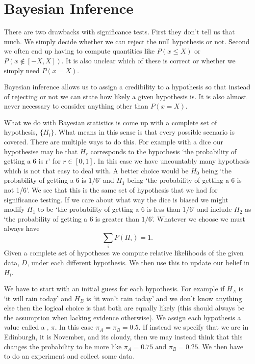 \documentclass[a4paper]{article}
\begin{document}
    \section{Bayesian Inference}
    There are two drawbacks with significance tests.
    First they don't tell us that much.
    We simply decide whether we can reject the null hypothesis or not.
    Second we often end up having to compute quantities like \(P(x \le X)\) or \(P(x \notin [-X, X])\).
    It is also unclear which of these is correct or whether we simply need \(P(x = X)\).
    
    Bayesian inference allows us to assign a credibility to a hypothesis so that instead of rejecting or not we can state how likely a given hypothesis is.
    It is also almost never necessary to consider anything other than \(P(x = X)\).
    
    What we do with Bayesian statistics is come up with a complete set of hypothesis, \(\{H_i\}\).
    What  means in this sense is that every possible scenario is covered.
    There are multiple ways to do this.
    For example with a dice our hypothesise may be that \(H_r\) corresponds to the hypothesis `the probability of getting a 6 is r' for \(r \in [0, 1]\).
    In this case we have uncountably many hypothesis which is not that easy to deal with.
    A better choice would be \(H_0\) being `the probability of getting a 6 is \(1/6\)' and \(H_1\) being `the probability of getting a 6 is not 1/6'.
    We see that this is the same set of hypothesis that we had for significance testing.
    If we care about what way the dice is biased we might modify \(H_1\) to be `the probability of getting a 6 is less than \(1/6\)' and include \(H_2\) as `the probability of getting a 6 is greater than \(1/6\)'.
    Whatever we choose we must always have
    \[\sum_i P(H_i) = 1.\]
    Given a complete set of hypotheses we compute relative likelihoods of the given data, \(D\), under each different hypothesis.
    We then use this to update our belief in \(H_i\).
    
    We have to start with an initial guess for each hypothesis.
    For example if \(H_A\) is `it will rain today' and \(H_B\) is `it won't rain today' and we don't know anything else then the logical choice is that both are equally likely (this should always be the assumption when lacking evidence otherwise).
    We assign each hypothesis a value called a , \(\pi\).
    In this case \(\pi_A = \pi_B = 0.5\).
    If instead we specify that we are in Edinburgh, it is November, and its cloudy, then we may instead think that this changes the probability to be more like \(\pi_A = 0.75\) and \(\pi_B = 0.25\).
    We then have to do an experiment and collect some data.
    
\end{document}

